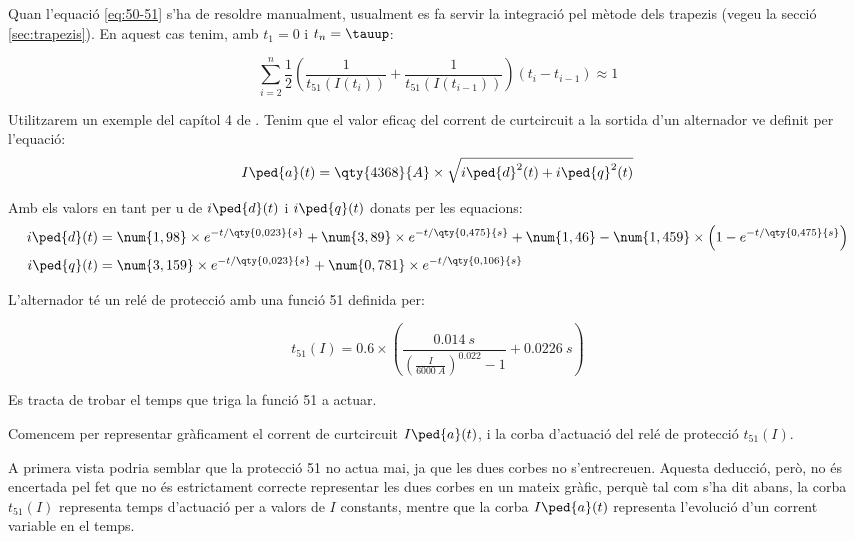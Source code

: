 Quan l'equació \eqref{eq:50-51} s'ha de resoldre manualment, usualment es fa servir la integració pel mètode dels trapezis (vegeu la secció \vref{sec:trapezis}). En aquest cas tenim, amb $t_1 = 0$ i $t_n = \tauup$:

\begin{equation}\label{eq:50-51-aprox}
	\sum_{i=2}^n \frac{1}{2} \left( \frac{1}{t_{51}(I(t_i))} + \frac{1}{t_{51}(I(t_{i-1}))} \right) (t_i - t_{i-1}) \approx 1
\end{equation}


\begin{exemple}\label{ex:ProtInvIntVar}
	\addcontentsxms{\ProtInvIntVar}	
	Utilitzarem un exemple del capítol 4 de \cite{REI}. Tenim que el valor eficaç del corrent de curtcircuit a la sortida d'un alternador ve definit per l'equació:
	\[
	I\ped{a}(t) = \qty{4368}{A} \times \sqrt{i\ped{d}^2(t) + i\ped{q}^2(t)}
	\]
	
	Amb els valors en tant per u de $i\ped{d}(t)$ i $i\ped{q}(t)$ donats per les equacions:
	\begin{align*}
		i\ped{d}(t) &= \num{1,98} \times e^{-t/\qty{0,023}{s}} + \num{3,89} \times e^{-t/\qty{0,475}{s}} + \num{1,46} - \num{1,459} \times \left( 1 - e^{-t/\qty{0,475}{s}}\right) \\
		i\ped{q}(t) &= 	\num{3,159} \times e^{-t/\qty{0,023}{s}} + \num{0,781} \times e^{-t/\qty{0,106}{s}}
	\end{align*}
	
	L'alternador té un relé de protecció amb una funció 51 definida per:
	
	\[
	t_{51}(I) = \num{0,6} \times \left(  \frac{\qty{0,014}{s}}{\left( \frac{I}{\qty{6000}{A}} \right) ^{\num{0,022}} -1} + \qty{0,0226}{s} \right)  
	\]
	
	Es tracta de trobar el temps que triga la funció 51 a actuar.
	
	Comencem per representar gràficament el corrent de curtcircuit $I\ped{a}(t)$, i la corba d'actuació del relé de protecció $t_{51}(I)$.
	
	\begin{center}
		
	\end{center}
	
	A primera vista podria semblar que la protecció 51 no actua mai, ja que les dues corbes no s'entrecreuen. Aquesta deducció, però,  no és encertada pel fet que  no és estrictament correcte representar les dues corbes en un mateix gràfic, perquè tal com s'ha dit abans, la corba $t_{51}(I)$ representa temps d'actuació per a valors de $I$ constants, mentre que la corba $I\ped{a}(t)$ representa l'evolució d'un corrent variable en el temps.
	

\end{exemple}
